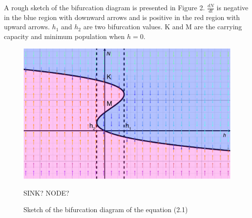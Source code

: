 \documentclass{amsart}
\theoremstyle{definition}
\theoremstyle{remark}
\numberwithin{equation}{section}
\newcommand{\blankbox}[2]{%
  \parbox{\columnwidth}{\centering
    \setlength{\fboxsep}{0pt}%
    \fbox{\raisebox{0pt}[#2]{\hspace{#1}}}%
  }%
}
\begin{document}
A rough sketch of the bifurcation diagram is presented in Figure 2. $\frac{dN}{dt}$ is negative in the blue region with downward arrows and is positive in the red region with upward arrows. $h_1$ and $h_2$ are two bifurcation values. K and M are the carrying capacity and minimum population when $h=0$.
\begin{figure}[tb]
\includegraphics[scale=0.4]{bifurcationdiagram30.jpg}
\caption{Sketch of the bifurcation diagram of the equation (2.1)} SINK? NODE?
\label{variable}
\end{figure}

\end{document}
